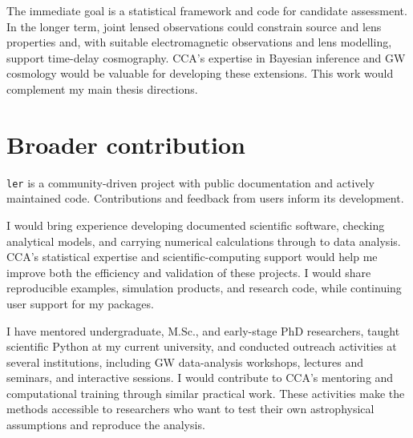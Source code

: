 \documentclass[11pt]{article}
\begin{document}
The immediate goal is a statistical framework and code for candidate assessment. In the longer term, joint lensed observations could constrain source and lens properties and, with suitable electromagnetic observations and lens modelling, support time-delay cosmography. CCA's expertise in Bayesian inference and GW cosmology would be valuable for developing these extensions. This work would complement my main thesis directions.

\section*{Broader contribution}

\texttt{ler} is a community-driven project with public documentation and actively maintained code. Contributions and feedback from users inform its development.

I would bring experience developing documented scientific software, checking analytical models, and carrying numerical calculations through to data analysis. CCA's statistical expertise and scientific-computing support would help me improve both the efficiency and validation of these projects. I would share reproducible examples, simulation products, and research code, while continuing user support for my packages.

I have mentored undergraduate, M.Sc., and early-stage PhD researchers, taught scientific Python at my current university, and conducted outreach activities at several institutions, including GW data-analysis workshops, lectures and seminars, and interactive sessions. I would contribute to CCA's mentoring and computational training through similar practical work. These activities make the methods accessible to researchers who want to test their own astrophysical assumptions and reproduce the analysis.
\end{document}
